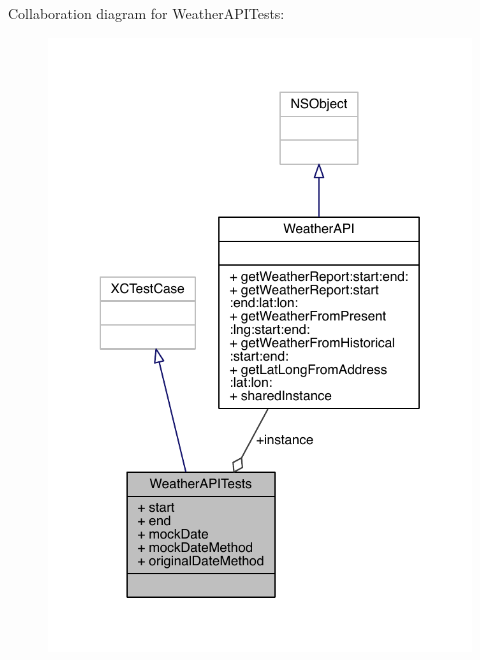 Collaboration diagram for Weather\-A\-P\-I\-Tests\-:\nopagebreak
\begin{figure}[H]
\begin{center}
\leavevmode
\includegraphics[width=319pt]{interface_weather_a_p_i_tests__coll__graph}
\end{center}
\end{figure}
